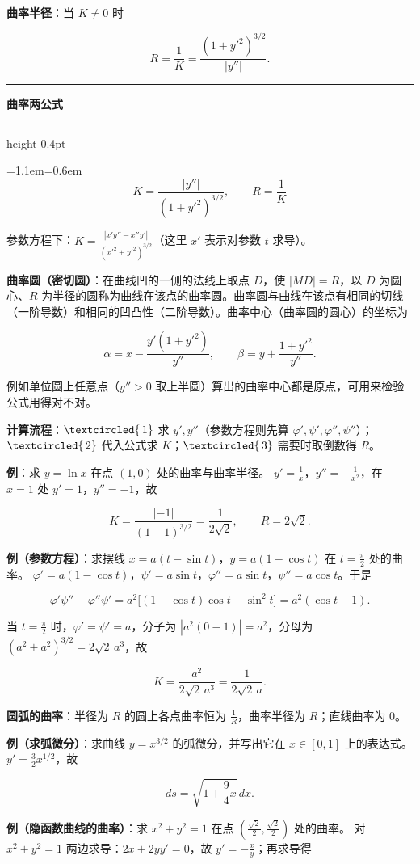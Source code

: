 \documentclass[11pt,openany,UTF8]{ctexbook}
\newcommand{\circled}[1]{\textcircled{\scriptsize\,#1}}
\newcommand{\callouthead}[2]{%
  \par\addvspace{7pt}\noindent
  {\color{#1}\rule[-0.15em]{3pt}{1.05em}}\hspace{0.5em}%
  {\bfseries\color{#1}#2}\par\nobreak\vspace{-0.35em}%
  {\color{rulesep}\hrule height 0.4pt}\nobreak\vspace{0.45em}%
  \begingroup\small\setlength{\parindent}{0pt}%
  \leftskip=1.1em\rightskip=0.6em\noindent\ignorespaces}
\newcommand{\calloutend}{\par\endgroup\addvspace{7pt}}
\newenvironment{callkey}[1]{\callouthead{keybar}{#1}}{\calloutend}
\begin{document}
\textbf{曲率半径}：当 $K\ne0$ 时

\[R=\frac1K=\frac{\left(1+y'^2\right)^{3/2}}{|y''|}.\]

\begin{callkey}{曲率两公式}
\[K=\frac{|y''|}{\left(1+y'^2\right)^{3/2}},\qquad R=\frac1K\]

参数方程下：$K=\frac{|x'y''-x''y'|}{\left(x'^2+y'^2\right)^{3/2}}$（这里 $x'$ 表示对参数 $t$ 求导）。

\end{callkey}

\textbf{曲率圆（密切圆）}：在曲线凹的一侧的法线上取点 $D$，使 $|MD|=R$，以 $D$ 为圆心、$R$ 为半径的圆称为曲线在该点的曲率圆。曲率圆与曲线在该点有相同的切线（一阶导数）和相同的凹凸性（二阶导数）。曲率中心（曲率圆的圆心）的坐标为

\[\alpha=x-\frac{y'(1+y'^2)}{y''},\qquad \beta=y+\frac{1+y'^2}{y''}.\]

例如单位圆上任意点（$y''>0$ 取上半圆）算出的曲率中心都是原点，可用来检验公式用得对不对。

\textbf{计算流程}：$\circled{1}$ 求 $y',y''$（参数方程则先算 $\varphi',\psi',\varphi'',\psi''$）；$\circled{2}$ 代入公式求 $K$；$\circled{3}$ 需要时取倒数得 $R$。

\textbf{例}：求 $y=\ln x$ 在点 $(1,0)$ 处的曲率与曲率半径。 $y'=\frac1x$，$y''=-\frac{1}{x^2}$，在 $x=1$ 处 $y'=1$，$y''=-1$，故

\[K=\frac{|-1|}{(1+1)^{3/2}}=\frac{1}{2\sqrt2},\qquad R=2\sqrt2 .\]

\textbf{例（参数方程）}：求摆线 $x=a(t-\sin t)$，$y=a(1-\cos t)$ 在 $t=\frac{\pi}{2}$ 处的曲率。 $\varphi'=a(1-\cos t)$，$\psi'=a\sin t$，$\varphi''=a\sin t$，$\psi''=a\cos t$。于是

\[\varphi'\psi''-\varphi''\psi'=a^2\big[(1-\cos t)\cos t-\sin^2t\big]=a^2(\cos t-1).\]

当 $t=\frac\pi2$ 时，$\varphi'=\psi'=a$，分子为 $|a^2(0-1)|=a^2$，分母为 $(a^2+a^2)^{3/2}=2\sqrt2\,a^3$，故

\[K=\frac{a^2}{2\sqrt2\,a^3}=\frac{1}{2\sqrt2\,a}.\]

\textbf{圆弧的曲率}：半径为 $R$ 的圆上各点曲率恒为 $\frac1R$，曲率半径为 $R$；直线曲率为 $0$。

\textbf{例（求弧微分）}：求曲线 $y=x^{3/2}$ 的弧微分，并写出它在 $x\in[0,1]$ 上的表达式。 $y'=\frac32x^{1/2}$，故

\[ds=\sqrt{1+\frac94x}\,dx .\]

\textbf{例（隐函数曲线的曲率）}：求 $x^2+y^2=1$ 在点 $\left(\frac{\sqrt2}{2},\frac{\sqrt2}{2}\right)$ 处的曲率。 对 $x^2+y^2=1$ 两边求导：$2x+2yy'=0$，故 $y'=-\frac xy$；再求导得
\end{document}
